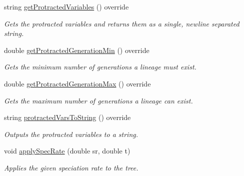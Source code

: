 \begin{DoxyCompactItemize}
string \hyperlink{class_protracted_tree_af0eca5eb2a790fcee9a0854e30088753}{get\+Protracted\+Variables} () override
\begin{DoxyCompactList}\small\item\em Gets the protracted variables and returns them as a single, newline separated string. \end{DoxyCompactList}\item 
double \hyperlink{class_protracted_tree_a331561815abc7d595e88d98e9268e7a1}{get\+Protracted\+Generation\+Min} () override
\begin{DoxyCompactList}\small\item\em Gets the minimum number of generations a lineage must exist. \end{DoxyCompactList}\item 
double \hyperlink{class_protracted_tree_a2093dd13cdbfc66e6c1de1406023bad6}{get\+Protracted\+Generation\+Max} () override
\begin{DoxyCompactList}\small\item\em Gets the maximum number of generations a lineage can exist. \end{DoxyCompactList}\item 
string \hyperlink{class_protracted_tree_a505a464578e6a7028e66f26b3e6b4a92}{protracted\+Vars\+To\+String} () override
\begin{DoxyCompactList}\small\item\em Outputs the protracted variables to a string. \end{DoxyCompactList}\item 
void \hyperlink{class_protracted_tree_a56a3631e65bb91d04ba4626c4c1ea79a}{apply\+Spec\+Rate} (double sr, double t)
\begin{DoxyCompactList}\small\item\em Applies the given speciation rate to the tree. \end{DoxyCompactList}\end{DoxyCompactItemize}
